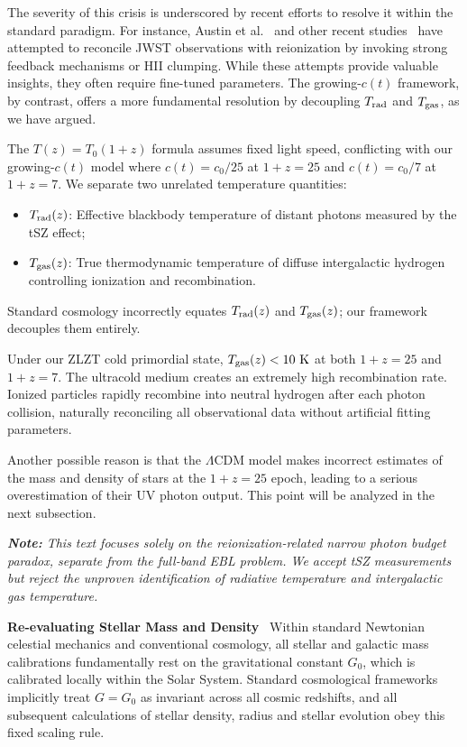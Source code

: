 \documentclass[12pt,leqno]{article}
\begin{document}
{	\medskip
	The severity of this crisis is underscored by recent efforts to resolve it within the standard paradigm. For instance, Austin et al.~\cite{Austin:2025} and other recent studies~\cite{Reionization:2025} have attempted to reconcile JWST observations with reionization by invoking strong feedback mechanisms or HII clumping. While these attempts provide valuable insights, they often require fine-tuned parameters. The growing-\(c(t)\) framework, by contrast, offers a more fundamental resolution by decoupling \(T_{\rm rad}\) and \(T_{\rm gas}\), as we have argued.
	
	\medskip
	The $T(z)=T_0(1+z)$ formula assumes fixed light speed, conflicting with our growing-$c(t)$ model where $c(t)=c_0/25$ at $1+z=25$ and $c(t)=c_0/7$ at $1+z=7$. We separate two unrelated temperature quantities:
	\begin{itemize}
		\item $T_{\rm rad}(z)$: Effective blackbody temperature of distant photons measured by the tSZ effect;
		\item $T_{\rm gas}(z)$: True thermodynamic temperature of diffuse intergalactic hydrogen controlling ionization and recombination.
	\end{itemize}
	
	Standard cosmology incorrectly equates $T_{\rm rad}(z)$ and $T_{\rm gas}(z)$; our framework decouples them entirely.
	
	\medskip
	Under our ZLZT cold primordial state, $T_{\rm gas}(z)<10\ \mathrm{K}$ at both $1+z=25$ and $1+z=7$. The ultracold medium creates an extremely high recombination rate. Ionized particles rapidly recombine into neutral hydrogen after each photon collision, naturally reconciling all observational data without artificial fitting parameters. 
	
	\medskip
	Another possible reason is that the $\Lambda$CDM model makes incorrect estimates of the mass and density of stars at the $1+z=25$ epoch, leading to a serious overestimation of their UV photon output. This point will be analyzed in the next subsection.
	
	\medskip
	\textit{\textbf{Note:} This text focuses solely on the reionization-related narrow photon budget paradox, separate from the full-band EBL problem. We accept tSZ measurements but reject the unproven identification of radiative temperature and intergalactic gas temperature.}
	
	
	\medskip
	\bigskip
	\textbf{Re-evaluating Stellar Mass and Density}\,\,\,
	Within standard Newtonian celestial mechanics and conventional cosmology, all stellar and galactic mass calibrations fundamentally rest on the gravitational constant $G_0$, which is calibrated locally within the Solar System. Standard cosmological frameworks implicitly treat $G=G_0$ as invariant across all cosmic redshifts, and all subsequent calculations of stellar density, radius and stellar evolution obey this fixed scaling rule.
	
}
\end{document}
